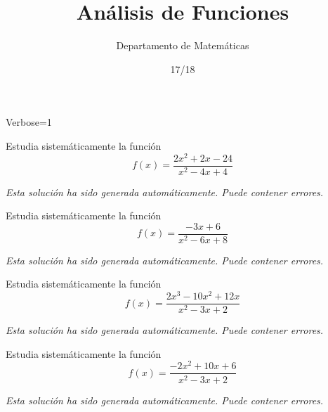 \documentclass[palatino,nosec]{Docencia}
\title{Análisis de Funciones}
\author{Departamento de Matemáticas}
\date{17/18}
\begin{document}
\pagestyle{plain}

\maketitle

\newif\ifverbose
\verbosetrue
\ifverbose
\begin{sagesilent}
	Verbose=1
\end{sagesilent}
\else
\begin{sagesilent}
	Verbose=0
\end{sagesilent}
\fi





\begin{problem} Estudia sistemáticamente la función
	\[
		f(x)=\frac{2x^2+2x-24}{x^2-4x+4}
	\]
\solution

\textit{Esta solución ha sido generada automáticamente. Puede contener errores.}


\end{problem}


\begin{problem} Estudia sistemáticamente la función
	\[
		f(x)=\frac{-3x+6}{x^2-6x+8}
	\]
\solution

\textit{Esta solución ha sido generada automáticamente. Puede contener errores.}


\end{problem}


\begin{problem} Estudia sistemáticamente la función
	\[
		f(x) = \frac{2x^3-10x^2+12x}{x^2-3x+2}
	\]
\solution

\textit{Esta solución ha sido generada automáticamente. Puede contener errores.}


\end{problem}



\begin{problem} Estudia sistemáticamente la función
	\[
		f(x) = \frac{-2x^2+10x+6}{x^2-3x+2}
	\]
\solution

\textit{Esta solución ha sido generada automáticamente. Puede contener errores.}


\end{problem}
\end{document}
